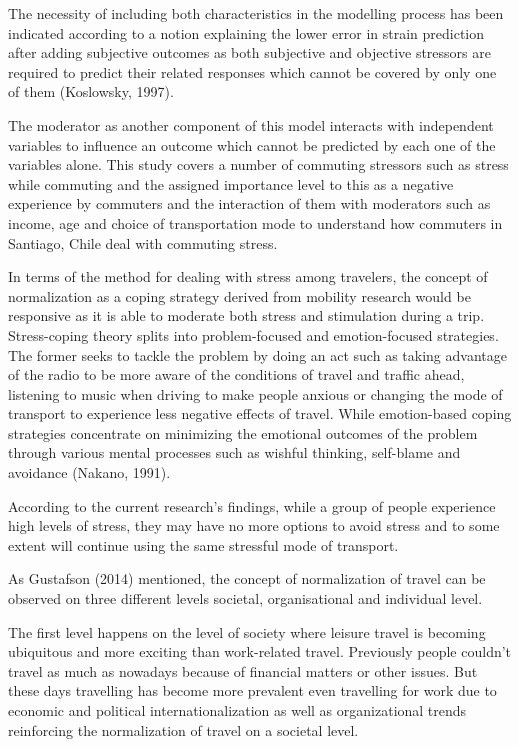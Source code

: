 \documentclass[
11pt, %
oneside, %
english, %
singlespacing, %
]{macthesis} %
\begin{document}
The necessity of including both characteristics in the modelling process has been indicated according to a notion explaining the lower error in strain prediction after adding subjective outcomes as both subjective and objective stressors are required to predict their related responses which cannot be covered by only one of them (Koslowsky, 1997).

The moderator as another component of this model interacts with independent variables to influence an outcome which cannot be predicted by each one of the variables alone. This study covers a number of commuting stressors such as stress while commuting and the assigned importance level to this as a negative experience by commuters and the interaction of them with moderators such as income, age and choice of transportation mode to understand how commuters in Santiago, Chile deal with commuting stress.

In terms of the method for dealing with stress among travelers, the concept of normalization as a coping strategy derived from mobility research would be responsive as it is able to moderate both stress and stimulation during a trip. Stress-coping theory splits into problem-focused and emotion-focused strategies. The former seeks to tackle the problem by doing an act such as taking advantage of the radio to be more aware of the conditions of travel and traffic ahead, listening to music when driving to make people anxious or changing the mode of transport to experience less negative effects of travel. While emotion-based coping strategies concentrate on minimizing the emotional outcomes of the problem through various mental processes such as wishful thinking, self-blame and avoidance (Nakano, 1991).

According to the current research's findings, while a group of people experience high levels of stress, they may have no more options to avoid stress and to some extent will continue using the same stressful mode of transport.

As Gustafson (2014) mentioned, the concept of normalization of travel can be observed on three different levels societal, organisational and individual level.

The first level happens on the level of society where leisure travel is becoming ubiquitous and more exciting than work-related travel. Previously people couldn't travel as much as nowadays because of financial matters or other issues. But these days travelling has become more prevalent even travelling for work due to economic and political internationalization as well as organizational trends reinforcing the normalization of travel on a societal level.
\end{document}
